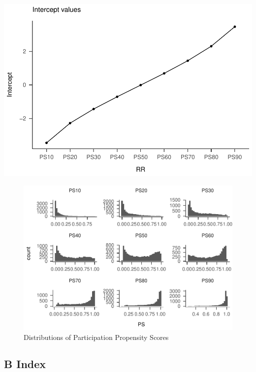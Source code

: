 \documentclass[man,floatsintext]{apa6}
\begin{document}
\includegraphics{Results_files/figure-latex/unnamed-chunk-4-1.pdf}

\begin{figure}
\centering
\includegraphics{Results_files/figure-latex/unnamed-chunk-5-1.pdf}
\caption{\label{fig:unnamed-chunk-5}Distributions of Participation Propensity Scores}
\end{figure}

\hypertarget{b-index}{%
\subsection{B Index}\label{b-index}}
\end{document}
